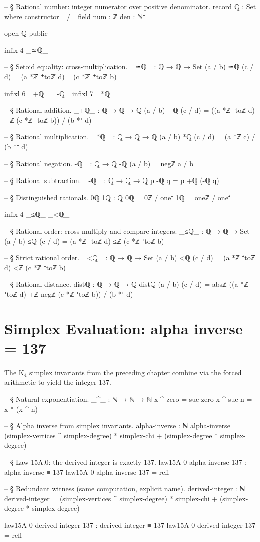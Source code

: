 \documentclass[11pt,a4paper]{book}
\def\alpha{alpha}%
\def\texorpdfstring#1#2{#2}%
\begin{document}
\begin{code}
-- § Rational number: integer numerator over positive denominator.
record ℚ : Set where
  constructor _/_
  field
    num : ℤ
    den : ℕ⁺

open ℚ public

infix 4 _≃ℚ_

-- § Setoid equality: cross-multiplication.
_≃ℚ_ : ℚ → ℚ → Set
(a / b) ≃ℚ (c / d) = (a *ℤ ⁺toℤ d) ≡ (c *ℤ ⁺toℤ b)

infixl 6 _+ℚ_ _-ℚ_
infixl 7 _*ℚ_

-- § Rational addition.
_+ℚ_ : ℚ → ℚ → ℚ
(a / b) +ℚ (c / d) = ((a *ℤ ⁺toℤ d) +ℤ (c *ℤ ⁺toℤ b)) / (b *⁺ d)

-- § Rational multiplication.
_*ℚ_ : ℚ → ℚ → ℚ
(a / b) *ℚ (c / d) = (a *ℤ c) / (b *⁺ d)

-- § Rational negation.
-ℚ_ : ℚ → ℚ
-ℚ (a / b) = negℤ a / b

-- § Rational subtraction.
_-ℚ_ : ℚ → ℚ → ℚ
p -ℚ q = p +ℚ (-ℚ q)

-- § Distinguished rationals.
0ℚ 1ℚ : ℚ
0ℚ = 0ℤ / one⁺
1ℚ = oneℤ / one⁺

infix 4 _≤ℚ_ _<ℚ_

-- § Rational order: cross-multiply and compare integers.
_≤ℚ_ : ℚ → ℚ → Set
(a / b) ≤ℚ (c / d) = (a *ℤ ⁺toℤ d) ≤ℤ (c *ℤ ⁺toℤ b)

-- § Strict rational order.
_<ℚ_ : ℚ → ℚ → Set
(a / b) <ℚ (c / d) = (a *ℤ ⁺toℤ d) <ℤ (c *ℤ ⁺toℤ b)

-- § Rational distance.
distℚ : ℚ → ℚ → ℚ
distℚ (a / b) (c / d) = absℤ ((a *ℤ ⁺toℤ d) +ℤ negℤ (c *ℤ ⁺toℤ b)) / (b *⁺ d)
\end{code}

\section{Simplex Evaluation: \texorpdfstring{$\alpha^{-1} = 137$}{alpha inverse = 137}}

The K$_4$ simplex invariants from the preceding chapter combine via the forced
arithmetic to yield the integer 137.

\begin{code}
-- § Natural exponentiation.
_^_ : ℕ → ℕ → ℕ
x ^ zero = suc zero
x ^ suc n = x * (x ^ n)

-- § Alpha inverse from simplex invariants.
alpha-inverse : ℕ
alpha-inverse = (simplex-vertices ^ simplex-degree) * simplex-chi + (simplex-degree * simplex-degree)

-- § Law 15A.0: the derived integer is exactly 137.
law15A-0-alpha-inverse-137 : alpha-inverse ≡ 137
law15A-0-alpha-inverse-137 = refl

-- § Redundant witness (same computation, explicit name).
derived-integer : ℕ
derived-integer =
  (simplex-vertices ^ simplex-degree) * simplex-chi
  + (simplex-degree * simplex-degree)

law15A-0-derived-integer-137 : derived-integer ≡ 137
law15A-0-derived-integer-137 = refl
\end{code}
\end{document}
